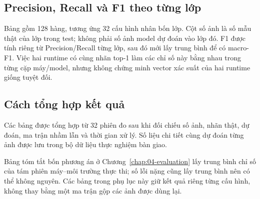 \subsection{Precision, Recall và F1 theo từng lớp}
Bảng gồm 128 hàng, tương ứng 32 cấu hình nhân bốn lớp. Cột số ảnh là số mẫu thật của lớp trong test; không phải số ảnh model dự đoán vào lớp đó. F1 được tính riêng từ Precision/Recall từng lớp, sau đó mới lấy trung bình để có macro-F1. Việc hai runtime có cùng nhãn top-1 làm các chỉ số này bằng nhau trong từng cặp máy/model, nhưng không chứng minh vector xác suất của hai runtime giống tuyệt đối.


\subsection{Cách tổng hợp kết quả}
Các bảng được tổng hợp từ 32 phiên đo sau khi đối chiếu số ảnh, nhãn thật, dự đoán, ma trận nhầm lẫn và thời gian xử lý. Số liệu chi tiết cùng dự đoán từng ảnh được lưu trong bộ dữ liệu thực nghiệm bàn giao.

Bảng tóm tắt bốn phương án ở Chương~\ref{chap:04-evaluation} lấy trung bình chỉ số của tám phiên máy--môi trường thực thi; số lỗi nặng cũng lấy trung bình nên có thể không nguyên. Các bảng trong phụ lục này giữ kết quả riêng từng cấu hình, không thay bằng một ma trận gộp các ảnh được dùng lại.
